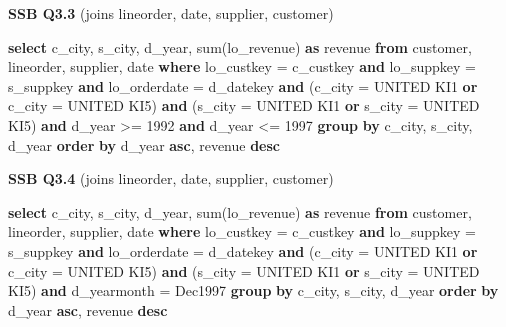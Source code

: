\documentclass[
  10pt,
]{article}
\newenvironment{Shaded}{}{}
\newcommand{\DataTypeTok}[1]{\textcolor[rgb]{0.56,0.13,0.00}{#1}}
\newcommand{\DecValTok}[1]{\textcolor[rgb]{0.25,0.63,0.44}{#1}}
\newcommand{\FunctionTok}[1]{\textcolor[rgb]{0.02,0.16,0.49}{#1}}
\newcommand{\KeywordTok}[1]{\textcolor[rgb]{0.00,0.44,0.13}{\textbf{#1}}}
\newcommand{\NormalTok}[1]{#1}
\newcommand{\OperatorTok}[1]{\textcolor[rgb]{0.40,0.40,0.40}{#1}}
\newcommand{\StringTok}[1]{\textcolor[rgb]{0.25,0.44,0.63}{#1}}
\begin{document}
\textbf{SSB Q3.3} (joins lineorder, date, supplier, customer)

\begin{Shaded}
\begin{Highlighting}[]
\KeywordTok{select}\NormalTok{ c\_city, s\_city, d\_year, }\FunctionTok{sum}\NormalTok{(lo\_revenue) }\KeywordTok{as}\NormalTok{ revenue}
\KeywordTok{from}\NormalTok{ customer, lineorder, supplier, }\DataTypeTok{date}
\KeywordTok{where}\NormalTok{ lo\_custkey }\OperatorTok{=}\NormalTok{ c\_custkey }\KeywordTok{and}\NormalTok{ lo\_suppkey }\OperatorTok{=}\NormalTok{ s\_suppkey }\KeywordTok{and}\NormalTok{ lo\_orderdate }\OperatorTok{=}\NormalTok{ d\_datekey }\KeywordTok{and}\NormalTok{ (c\_city }\OperatorTok{=} \StringTok{\textquotesingle{}UNITED KI1\textquotesingle{}} \KeywordTok{or}\NormalTok{ c\_city }\OperatorTok{=} \StringTok{\textquotesingle{}UNITED KI5\textquotesingle{}}\NormalTok{) }\KeywordTok{and}\NormalTok{ (s\_city }\OperatorTok{=} \StringTok{\textquotesingle{}UNITED KI1\textquotesingle{}} \KeywordTok{or}\NormalTok{ s\_city }\OperatorTok{=} \StringTok{\textquotesingle{}UNITED KI5\textquotesingle{}}\NormalTok{) }\KeywordTok{and}\NormalTok{ d\_year }\OperatorTok{\textgreater{}=} \DecValTok{1992} \KeywordTok{and}\NormalTok{ d\_year }\OperatorTok{\textless{}=} \DecValTok{1997}
\KeywordTok{group} \KeywordTok{by}\NormalTok{ c\_city, s\_city, d\_year}
\KeywordTok{order} \KeywordTok{by}\NormalTok{ d\_year }\KeywordTok{asc}\NormalTok{, revenue }\KeywordTok{desc}
\end{Highlighting}
\end{Shaded}

\textbf{SSB Q3.4} (joins lineorder, date, supplier, customer)

\begin{Shaded}
\begin{Highlighting}[]
\KeywordTok{select}\NormalTok{ c\_city, s\_city, d\_year, }\FunctionTok{sum}\NormalTok{(lo\_revenue) }\KeywordTok{as}\NormalTok{ revenue}
\KeywordTok{from}\NormalTok{ customer, lineorder, supplier, }\DataTypeTok{date}
\KeywordTok{where}\NormalTok{ lo\_custkey }\OperatorTok{=}\NormalTok{ c\_custkey }\KeywordTok{and}\NormalTok{ lo\_suppkey }\OperatorTok{=}\NormalTok{ s\_suppkey }\KeywordTok{and}\NormalTok{ lo\_orderdate }\OperatorTok{=}\NormalTok{ d\_datekey }\KeywordTok{and}\NormalTok{ (c\_city }\OperatorTok{=} \StringTok{\textquotesingle{}UNITED KI1\textquotesingle{}} \KeywordTok{or}\NormalTok{ c\_city }\OperatorTok{=} \StringTok{\textquotesingle{}UNITED KI5\textquotesingle{}}\NormalTok{) }\KeywordTok{and}\NormalTok{ (s\_city }\OperatorTok{=} \StringTok{\textquotesingle{}UNITED KI1\textquotesingle{}} \KeywordTok{or}\NormalTok{ s\_city }\OperatorTok{=} \StringTok{\textquotesingle{}UNITED KI5\textquotesingle{}}\NormalTok{) }\KeywordTok{and}\NormalTok{ d\_yearmonth }\OperatorTok{=} \StringTok{\textquotesingle{}Dec1997\textquotesingle{}}
\KeywordTok{group} \KeywordTok{by}\NormalTok{ c\_city, s\_city, d\_year}
\KeywordTok{order} \KeywordTok{by}\NormalTok{ d\_year }\KeywordTok{asc}\NormalTok{, revenue }\KeywordTok{desc}
\end{Highlighting}
\end{Shaded}
\end{document}
